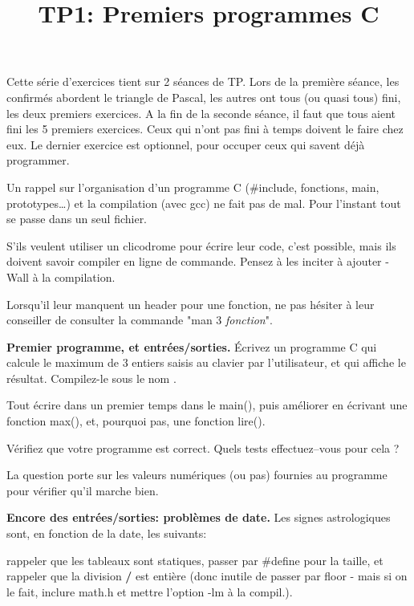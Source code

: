 \documentclass[10pt]{article}\usepackage[correction]{esial}
\begin{document}
\title{TP1: Premiers programmes C}
\maketitle


\begin{Reponse}
  Cette série d'exercices tient sur 2 séances de TP.  Lors de la première
  séance, les confirmés abordent le triangle de Pascal, les autres ont tous (ou
  quasi tous) fini, les deux premiers exercices. A la fin de la seconde séance,
  il faut que tous aient fini les 5 premiers exercices. Ceux qui n'ont pas fini
  à temps doivent le faire chez eux. Le dernier exercice est optionnel, pour
  occuper ceux qui savent déjà programmer.

  Un rappel sur l'organisation d'un programme C (\#include, fonctions, main,
  prototypes\ldots) et la compilation (avec gcc) ne fait pas de mal. Pour
  l'instant tout se passe dans un seul fichier.

  S'ils veulent utiliser un clicodrome pour écrire leur code, c'est possible,
  mais ils doivent savoir compiler en ligne de commande. Pensez à les inciter à
  ajouter -Wall à la compilation.

  Lorsqu'il leur manquent un header pour une fonction, ne pas hésiter à leur
  conseiller de consulter la commande "man 3 \emph{fonction}".
\end{Reponse}
\Exercice \textbf{Premier programme, et entrées/sorties.}
\Question Écrivez un programme C qui calcule le maximum de 3 entiers saisis au
clavier par l'utilisateur, et qui affiche le résultat. Compilez-le sous le nom
. 

\begin{Reponse}
  Tout écrire dans un premier temps dans le main(), puis améliorer en écrivant
  une fonction max(), et, pourquoi pas, une fonction lire().
\end{Reponse}

\Question Vérifiez que votre programme est correct. Quels tests effectuez--vous
pour cela ?

\begin{Reponse}
  La question porte sur les valeurs numériques (ou pas) fournies au programme
  pour vérifier qu'il marche bien.
\end{Reponse}

\Exercice \textbf{Encore des entrées/sorties: problèmes de date.}
Les signes astrologiques sont, en fonction de la date, les suivants: 

\begin{Reponse}
  rappeler que les tableaux sont statiques, passer par \#define pour la taille,
  et rappeler que la division {\bf /} est entière (donc inutile de passer par
  floor - mais si on le fait, inclure math.h et mettre l'option -lm à la
  compil.).
\end{Reponse}
\end{document}
